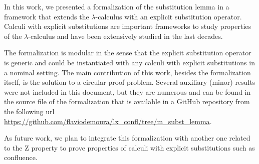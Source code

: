  In this work, we presented a formalization of the substitution lemma in a framework that extends the $\lambda$-calculus with an explicit substitution operator. Calculi with explicit substitutions are important frameworks to study properties of the $\lambda$-calculus and have been extensively studied in the last decades\cite{abadiExplicitSubstitutions1991,accattoliAbstractFactorizationTheorem2012,ayala-rinconComparingCalculiExplicit2002,ayala-rinconComparingImplementingCalculi2005,bonelliPerpetualityNamedLambda2001,fujitaChurchRosserTheoremCompositional2016}. 


The formalization is modular in the sense that the explicit substitution operator is generic and could be instantiated with any calculi with  explicit substitutions in a nominal setting. The main contribution of this work, besides the formalization itself, is the solution to a circular proof problem. Several auxiliary (minor) results were not included in this document, but they are numerous and can be found in the source file of the formalization that is available in a GitHub repository from the following url \url{https://github.com/flaviodemoura/lx_confl/tree/m_subst_lemma}.


As future work, we plan to integrate this formalization with another one related to the Z property \cite{fmm2021} to prove properties of calculi with explicit substitutions such as confluence\cite{nakazawaCompositionalConfluenceProofs2016,nakazawaCallbyvalue2017,kesnerPerpetualityFullSafe2008}. 
\begin{coqdoccode}
\end{coqdoccode}
